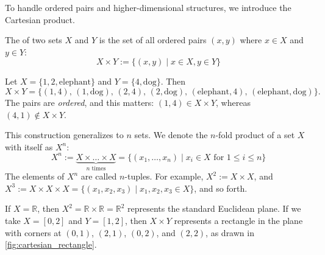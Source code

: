 To handle ordered pairs and higher-dimensional structures, we introduce the Cartesian product.

\begin{definition}
\label{def:cartesian_product}
The  of two sets $X$ and $Y$ is the set of all ordered pairs $(x, y)$ where $x \in X$ and $y \in Y$:
\[
X \times Y := \{(x, y) \mid x \in X, y \in Y\}
\]
\end{definition}

\begin{example}
\label{ex:finite_cartesian_product}
Let $X = \{1, 2, \text{elephant}\}$ and $Y = \{4, \text{dog}\}$. Then
\[
X \times Y = \{(1,4), \, (1,\text{dog}), \, (2,4), \, (2,\text{dog}), \, (\text{elephant},4), \, (\text{elephant},\text{dog})\}.
\]
The pairs are \textit{ordered}, and this matters: $(1,4) \in X \times Y$, whereas $(4,1) \notin X \times Y$.
\end{example}

This construction generalizes to $n$ sets. We denote the $n$-fold product of a set $X$ with itself as $X^n$:
\[
X^n := \underbrace{X \times \dots \times X}_{n \text{ times}} = \{(x_1, \dots, x_n) \mid x_i \in X \text{ for } 1 \le i \le n\}
\]
The elements of $X^n$ are called $n$-tuples. For example, $X^2 := X \times X$, and $X^3 := X \times X \times X = \{(x_1, x_2, x_3) \mid x_1, x_2, x_3 \in X\}$, and so forth.

\begin{example}
If $X = \mathbb{R}$, then $X^2 = \mathbb{R} \times \mathbb{R} = \mathbb{R}^2$ represents the standard Euclidean plane. If we take $X = [0, 2]$ and $Y = [1, 2]$, then $X \times Y$ represents a rectangle in the plane with corners at $(0,1)$, $(2,1)$, $(0,2)$, and $(2,2)$, as drawn in \cref{fig:cartesian_rectangle}.
\end{example}

